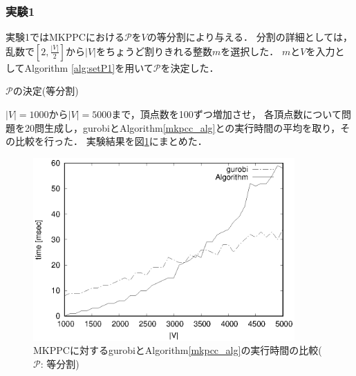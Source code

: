 \documentclass[11pt,dvipdfmx]{jarticle}
\numberwithin{equation}{section}
\begin{document}
        \subsubsection{実験1}
            実験1ではMKPPCにおける$\mathcal{P}$を$V$の等分割により与える．
            分割の詳細としては，乱数で$[2,\frac{|V|}{2}]$から$|V|$をちょうど割りきれる整数$m$を選択した．
            $m$と$V$を入力としてAlgorithm \ref{alg:setP1}を用いて$\mathcal{P}$を決定した．\par
            \begin{algorithm}
                \caption{$\mathcal{P}$の決定(等分割)}
                \label{alg:setP1}
                \begin{algorithmic}[1]
                        \EndWhile
                    \EndWhile
                \end{algorithmic}
            \end{algorithm}
            $|V|=1000$から$|V|=5000$まで，頂点数を100ずつ増加させ，
            各頂点数について問題を20問生成し，gurobiとAlgorithm\ref{mkpcc_alg}との実行時間の平均を取り，その比較を行った．
            実験結果を図\ref{test1}にまとめた．\par
            \begin{figure}[htbp]
                \begin{center}
                    \includegraphics[width=100mm]{jikken1.eps}
                \end{center}
                \caption{MKPPCに対するgurobiとAlgorithm\ref{mkpcc_alg}の実行時間の比較($\mathcal{P}$: 等分割)}
                \label{test1}
            \end{figure}
\end{document}
